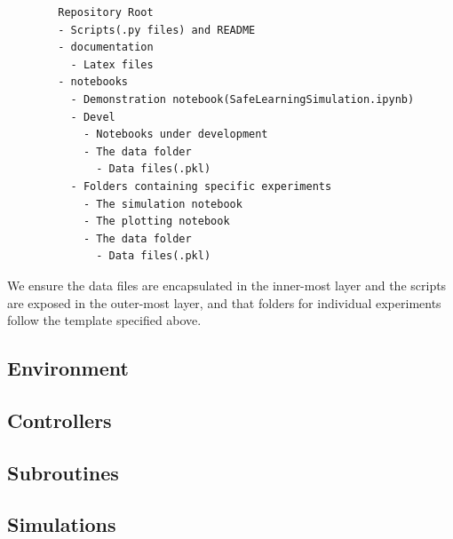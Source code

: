 \documentclass{article}
\theoremstyle{definition}
\theoremstyle{remark}
\begin{document}
	\begin{verbatim}
		Repository Root
		- Scripts(.py files) and README
		- documentation
		  - Latex files
		- notebooks
		  - Demonstration notebook(SafeLearningSimulation.ipynb)
		  - Devel
		    - Notebooks under development
		    - The data folder
		      - Data files(.pkl)
		  - Folders containing specific experiments
		    - The simulation notebook
		    - The plotting notebook
		    - The data folder
		      - Data files(.pkl)
	\end{verbatim}
	We ensure the data files are encapsulated in the inner-most layer and the scripts are exposed in the outer-most layer, and that folders for individual experiments follow the template specified above.
	\subsection{Environment}
	\subsection{Controllers}
	\subsection{Subroutines}
	\subsection{Simulations}
	
	
\end{document}

